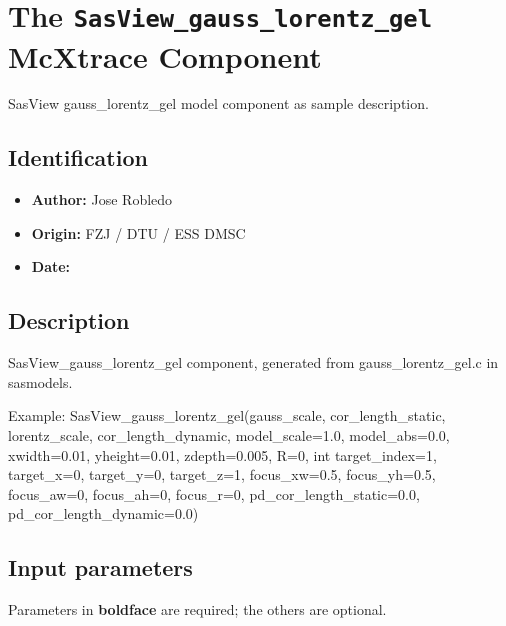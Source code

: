 \section{The \texttt{SasView\_gauss\_lorentz\_gel} McXtrace Component}
SasView gauss\_lorentz\_gel model component as sample description.

\subsection*{Identification}
\begin{itemize}
  \item \textbf{Author:} Jose Robledo
  \item \textbf{Origin:} FZJ / DTU / ESS DMSC
  \item \textbf{Date:} 
\end{itemize}

\subsection*{Description}
SasView\_gauss\_lorentz\_gel component, generated from gauss\_lorentz\_gel.c in sasmodels.

Example: SasView\_gauss\_lorentz\_gel(gauss\_scale, cor\_length\_static, lorentz\_scale, cor\_length\_dynamic, model\_scale=1.0, model\_abs=0.0, xwidth=0.01, yheight=0.01, zdepth=0.005, R=0, int target\_index=1, target\_x=0, target\_y=0, target\_z=1, focus\_xw=0.5, focus\_yh=0.5, focus\_aw=0, focus\_ah=0, focus\_r=0, pd\_cor\_length\_static=0.0, pd\_cor\_length\_dynamic=0.0)

\subsection*{Input parameters}
Parameters in \textbf{boldface} are required; the others are optional.

